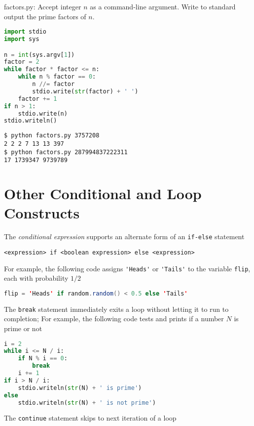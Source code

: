 \documentclass[8pt,a4paper,compress]{beamer}
\begin{document}
\begin{frame}[fragile]
\begin{framed}
\tiny factors.py: Accept integer $n$ as a command-line argument. Write to standard output the prime factors of $n$.
\end{framed}

\begin{lstlisting}[language=Python]
import stdio
import sys

n = int(sys.argv[1])
factor = 2
while factor * factor <= n:
    while n % factor == 0:
        n //= factor
        stdio.write(str(factor) + ' ')
    factor += 1
if n > 1:
    stdio.write(n)
stdio.writeln()
\end{lstlisting}

\begin{lstlisting}[language={}]
$ python factors.py 3757208
2 2 2 7 13 13 397
$ python factors.py 287994837222311
17 1739347 9739789
\end{lstlisting}
\end{frame}

\section{Other Conditional and Loop Constructs}
\begin{frame}[fragile]
The \emph{conditional expression} supports an alternate form of an \lstinline$if-else$ statement
 
\begin{lstlisting}[language={}]
<expression> if <boolean expression> else <expression>
\end{lstlisting}

For example, the following code assigns \lstinline{'Heads'} or \lstinline{'Tails'} to the variable \lstinline{flip}, each with probability $1/2$

\begin{lstlisting}[language=Java]
flip = 'Heads' if random.random() < 0.5 else 'Tails'
\end{lstlisting}

\bigskip

The \lstinline{break} statement immediately exits a loop without letting it to run to completion; For example, the following code tests and prints if a number $N$ is prime or not
\begin{lstlisting}[language=Python]
i = 2
while i <= N / i:
    if N % i == 0:
        break
    i += 1
if i > N / i:
    stdio.writeln(str(N) + ' is prime')
else 
    stdio.writeln(str(N) + ' is not prime')
\end{lstlisting}

\bigskip

The \lstinline{continue} statement skips to next iteration of a loop
\end{frame}
\end{document}
